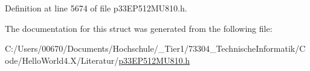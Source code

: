 Definition at line 5674 of file p33\+E\+P512\+M\+U810.\+h.



The documentation for this struct was generated from the following file\+:\begin{DoxyCompactItemize}
\item 
C\+:/\+Users/00670/\+Documents/\+Hochschule/\+\_\+\+Tier1/73304\+\_\+\+Technische\+Informatik/\+Code/\+Hello\+World4.\+X/\+Literatur/\hyperlink{p33_e_p512_m_u810_8h}{p33\+E\+P512\+M\+U810.\+h}\end{DoxyCompactItemize}
